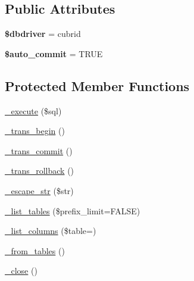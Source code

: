 \subsection*{Public Attributes}
\begin{DoxyCompactItemize}
\item 
\mbox{\label{class_c_i___d_b__cubrid__driver_a62080031e885174d89dbc143e693123c}} 
{\bfseries \$dbdriver} = \textquotesingle{}cubrid\textquotesingle{}
\item 
\mbox{\label{class_c_i___d_b__cubrid__driver_a14e3b0565b70a85096c1372b70f1ff50}} 
{\bfseries \$auto\+\_\+commit} = T\+R\+UE
\end{DoxyCompactItemize}
\subsection*{Protected Member Functions}
\begin{DoxyCompactItemize}
\item 
\mbox{\hyperlink{class_c_i___d_b__cubrid__driver_ad6c4f37f211857492d93968804963db1}{\+\_\+execute}} (\$sql)
\item 
\mbox{\hyperlink{class_c_i___d_b__cubrid__driver_aba7305b5e1cd226ffffbf963a3b708d9}{\+\_\+trans\+\_\+begin}} ()
\item 
\mbox{\hyperlink{class_c_i___d_b__cubrid__driver_a5080ca0d55d1d33fa097cbec02be887a}{\+\_\+trans\+\_\+commit}} ()
\item 
\mbox{\hyperlink{class_c_i___d_b__cubrid__driver_a7f6cefcfcb8c080075a8c2a55763fcaf}{\+\_\+trans\+\_\+rollback}} ()
\item 
\mbox{\hyperlink{class_c_i___d_b__cubrid__driver_a0d061096b9da3a9968fb7ecad5e6ef0b}{\+\_\+escape\+\_\+str}} (\$str)
\item 
\mbox{\hyperlink{class_c_i___d_b__cubrid__driver_a183f4936d33a4a92e4c8f208557db804}{\+\_\+list\+\_\+tables}} (\$prefix\+\_\+limit=F\+A\+L\+SE)
\item 
\mbox{\hyperlink{class_c_i___d_b__cubrid__driver_a7efaa7e06059cc9e9693cc97018b2e8a}{\+\_\+list\+\_\+columns}} (\$table=\textquotesingle{}\textquotesingle{})
\item 
\mbox{\hyperlink{class_c_i___d_b__cubrid__driver_a7f5c12db6fee50e13e3908517325f1e6}{\+\_\+from\+\_\+tables}} ()
\item 
\mbox{\hyperlink{class_c_i___d_b__cubrid__driver_a3f707e7acf003289362d1428c2a3bcbe}{\+\_\+close}} ()
\end{DoxyCompactItemize}
